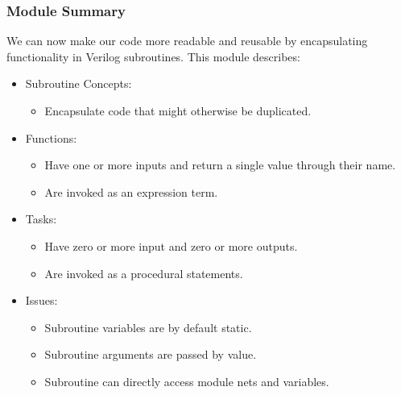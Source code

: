 \documentclass[t, notes, xcolor=table]{beamer}
\begin{document}
\begin{frame}
\frametitle{Module Summary}
We can now make our code more readable and reusable by encapsulating functionality in Verilog subroutines.
\newline
This module describes:
\begin{itemize}
\item Subroutine Concepts:
\begin{itemize}
	\item Encapsulate code that might otherwise be duplicated.
\end{itemize}
\item Functions:
\begin{itemize}
	\item Have one or more inputs and return a single value through their name.
	\item Are invoked as an expression term.
\end{itemize}
\item Tasks:
\begin{itemize}
	\item Have zero or more input and zero or more outputs.
	\item Are invoked as a procedural statements.
\end{itemize}
\item Issues:
\begin{itemize}
	\item Subroutine variables are by default static.
	\item Subroutine arguments are passed by value.
	\item Subroutine can directly access module nets and variables.
\end{itemize}
\end{itemize}
\end{frame}
\end{document}
